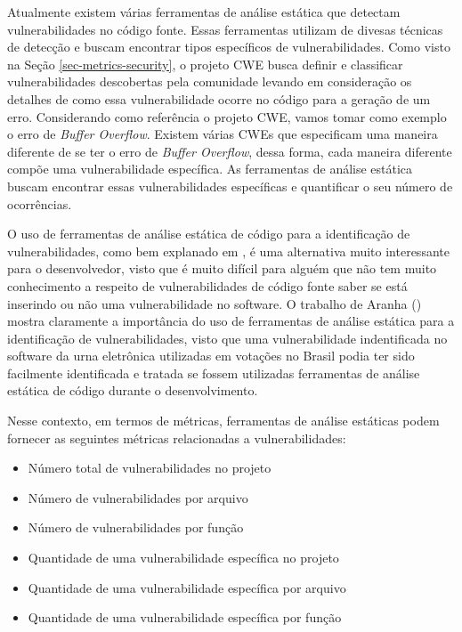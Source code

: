 Atualmente existem várias ferramentas de análise estática que detectam vulnerabilidades no código fonte. Essas ferramentas utilizam de divesas técnicas de detecção e buscam encontrar tipos específicos de vulnerabilidades. Como visto na Seção \ref{sec-metrics-security}, o projeto CWE busca definir  e classificar vulnerabilidades descobertas pela comunidade levando em consideração os detalhes de como essa vulnerabilidade ocorre no código para a geração de um erro. Considerando como referência o projeto CWE, vamos tomar como exemplo o erro de \emph{Buffer Overflow}. Existem várias CWEs que especificam uma maneira diferente de se ter o erro de \emph{Buffer Overflow}, dessa forma, cada maneira diferente compõe uma vulnerabilidade específica. As ferramentas de análise estática buscam  encontrar essas vulnerabilidades específicas e quantificar o seu número de ocorrências. 

O uso de ferramentas de análise estática de código para a identificação de vulnerabilidades, como bem explanado em \cite{chess2007}, é uma alternativa muito interessante para o desenvolvedor, visto que é muito difícil para alguém que não tem muito conhecimento a respeito de vulnerabilidades de código fonte saber se está inserindo ou não uma vulnerabilidade no software. O trabalho de Aranha (\citeyear{aranha2012}) mostra claramente a importância do uso de ferramentas de análise estática para a identificação de vulnerabilidades, visto que uma vulnerabilidade indentificada no software da urna eletrônica utilizadas em votações no Brasil podia ter sido facilmente identificada e tratada se fossem utilizadas ferramentas de análise estática de código durante o desenvolvimento.

%

Nesse contexto, em termos de métricas, ferramentas de análise estáticas podem fornecer as seguintes métricas relacionadas a vulnerabilidades:

\begin{itemize}
\item Número total de vulnerabilidades no projeto
\item Número de vulnerabilidades por arquivo
\item Número de vulnerabilidades por função
\item Quantidade de uma vulnerabilidade específica no projeto
\item Quantidade de uma vulnerabilidade específica por arquivo
\item Quantidade de uma vulnerabilidade específica por função
\end{itemize}

